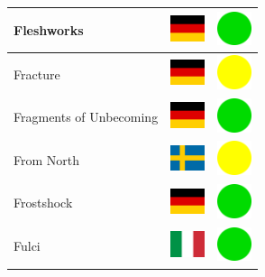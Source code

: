 \documentclass[12pt, a4paper, twoside]{report}
\begin{document}
\begin{center}
\begin{longtable}{|p{5cm}|p{2cm}|p{2cm}|}
 Fleshworks                                                 & \includegraphics[width=1cm]{../4x3/de} &   \includegraphics[width=1cm]{../likes/y} \\ \hline
 Fracture                                                   & \includegraphics[width=1cm]{../4x3/de} &   \includegraphics[width=1cm]{../likes/m} \\ \hline
 Fragments of Unbecoming                                    & \includegraphics[width=1cm]{../4x3/de} &   \includegraphics[width=1cm]{../likes/y} \\ \hline
 From North                                                 & \includegraphics[width=1cm]{../4x3/se} &   \includegraphics[width=1cm]{../likes/m} \\ \hline
 Frostshock                                                 & \includegraphics[width=1cm]{../4x3/de} &   \includegraphics[width=1cm]{../likes/y} \\ \hline
 Fulci                                                      & \includegraphics[width=1cm]{../4x3/it} &   \includegraphics[width=1cm]{../likes/y} \\ \hline

\end{longtable}
\end{center}
\end{document}
